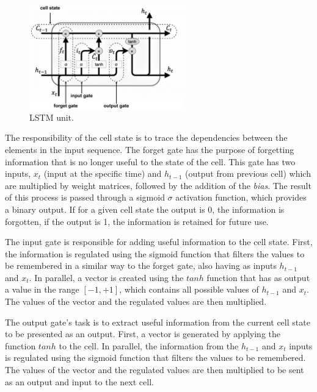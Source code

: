 \begin{figure}[h!]
    \centering
    \begin{center}
    \includegraphics[width=0.6\textwidth]{Images/LSTM_cell_detailed.png}
    \caption{LSTM unit.}
    \label{lstm}
    \end{center}
\end{figure}

The responsibility of the cell state is to trace the dependencies between the elements in the input sequence. The forget gate has the purpose of forgetting information that is no longer useful to the state of the cell. This gate has two inputs, $x_t$ (input at the specific time) and $h_{t-1}$ (output from previous cell) which are multiplied by weight matrices, followed by the addition of the \textit{bias}. The result of this process is passed through a sigmoid $\sigma$ activation function, which provides a binary output. If for a given cell state the output is 0, the information is forgotten, if the output is 1, the information is retained for future use.

The input gate is responsible for adding useful information to the cell state. First, the information is regulated using the sigmoid function that filters the values to be remembered in a similar way to the forget gate, also having as inputs $h_{t-1}$ and $x_t$. In parallel, a vector is created using the $tanh$ function that has as output a value in the range $ [-1, +1]$, which contains all possible values of $h_{t-1}$ and $x_t$. The values of the vector and the regulated values are then multiplied. 

The output gate's task is to extract useful information from the current cell state to be presented as an output. First, a vector is generated by applying the function $tanh$ to the cell. In parallel, the information from the $h_{t-1}$ and $x_t$ inputs is regulated using the sigmoid function that filters the values to be remembered. The values of the vector and the regulated values are then multiplied to be sent as an output and input to the next cell.

